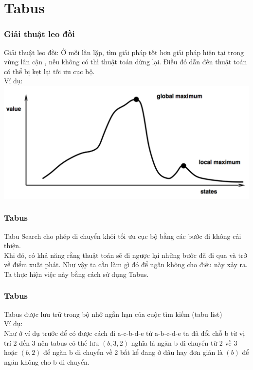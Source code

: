 \documentclass[12pt]{beamer}
\begin{document}
	\section{Tabus}
	\begin{frame}
		\frametitle{Giải thuật leo đồi}
		Giải thuật leo đồi: Ở mỗi lần lặp, tìm giải pháp tốt hơn giải pháp hiện tại trong vùng lân cận , nếu không có thì thuật toán dừng lại. Điều đó dẫn đến thuật toán có thể bị kẹt lại tối ưu cục bộ.\\
		Ví dụ:\\
		\includegraphics[scale=0.4]{HillClimbing.png}\\
	\end{frame}
	
	\begin{frame}
		\frametitle{Tabus}
		Tabu Search cho phép di chuyển khỏi tối ưu cục bộ bằng các bước đi không cải thiện.\\
		Khi đó, có khả năng rằng thuật toán sẽ đi ngược lại những bước đã đi qua và trở về điểm xuất phát. Như vậy ta cần làm gì đó để ngăn không cho điều này xảy ra.\\
		Ta thực hiện việc này bằng cách sử dụng Tabus.
	\end{frame}
	
	\begin{frame}
		\frametitle{Tabus}
		Tabus được lưu trữ trong bộ nhớ ngắn hạn của cuộc tìm kiếm (tabu list)\\
		Ví dụ:\\
		Như ở ví dụ trước để có được cách đi a-c-b-d-e từ a-b-c-d-e ta đã đổi chỗ b từ vị trí 2 đến 3 nên tabus có thể lưu $(b, 3, 2)$ nghĩa là ngăn b di chuyển từ 2 về 3 hoặc $(b, 2)$ để ngăn b di chuyển về 2 bất kể đang ở đâu hay đơn giản là $(b)$ để ngăn không cho b di chuyển.
	\end{frame}
	
\end{document}
